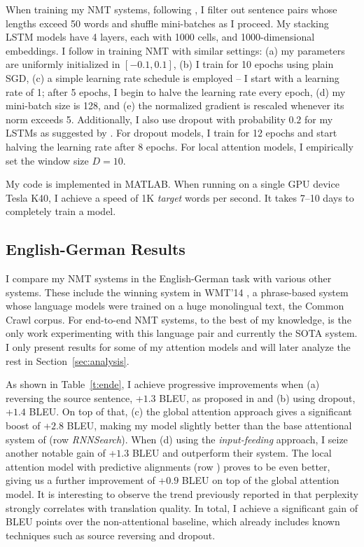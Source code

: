 When training my NMT systems, following \cite{bog15,jean15}, I filter out
sentence pairs whose lengths exceed 50 words and shuffle mini-batches as I
proceed. My stacking LSTM models have 4 layers, each with 1000 cells, and
1000-dimensional embeddings. I follow \cite{sutskever14,luong15} in training
NMT with similar settings: (a) my parameters are uniformly initialized in
$[-0.1, 0.1]$, (b) I train for 10 epochs using plain SGD, (c) a simple learning
rate schedule is employed -- I start with a learning rate of 1; after 5 epochs,
I begin to halve the learning rate every epoch, (d) my mini-batch size is 128,
and (e) the normalized gradient is rescaled whenever its norm exceeds 5.
Additionally, I also use dropout with probability $0.2$ for my LSTMs as suggested by
\cite{zaremba14}. For dropout models, I train for 12 epochs and start halving
the learning rate after 8 epochs. For local
attention models, I empirically set the window size $D=10$.

My code is implemented in MATLAB. %
When running on a single GPU device Tesla K40, I achieve a speed of 1K {\it
target} words per second. It takes 7--10 days to completely train a model.

\subsection{English-German Results}
I compare my NMT systems in the English-German task with various other
systems. These include the winning system in WMT'14
\cite{buck14}, a phrase-based system whose language models were trained on a
huge monolingual text, the Common Crawl corpus. For end-to-end NMT systems, to the best of my knowledge, \cite{jean15} is the only work experimenting with this language pair and currently the SOTA system.
I only present results for some of my attention models and will later
analyze the rest in Section~\ref{sec:analysis}. 

\begin{sloppypar}
As shown in Table~\ref{t:ende}, I achieve progressive improvements when
(a) reversing the source sentence, +$1.3$ BLEU, as proposed in \cite{sutskever14}
and (b) using dropout, +$1.4$ BLEU. On top of that, (c) the global
attention approach gives a significant boost of +$2.8$ BLEU, making 
 my model slightly better than the base attentional system of
  (row {\it RNNSearch}). When (d) using the {\it input-feeding}
approach, I seize another notable gain of +$1.3$ BLEU and outperform their
system. The local attention model with predictive alignments (row {\it \localp}) proves
to be even better, giving us a further improvement of +$0.9$ BLEU on top of the
global attention model. 
It is interesting to observe the trend previously reported in
\cite{luong15} that perplexity strongly correlates with translation quality.
In total, I achieve a significant gain of
\attngain{} BLEU points over the non-attentional baseline, which already includes
known techniques such as source reversing and dropout.
\end{sloppypar}

